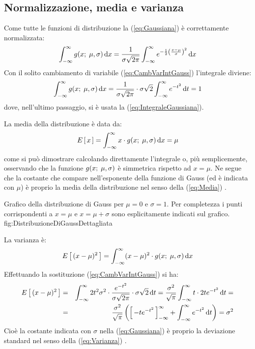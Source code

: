 \subsection{Normalizzazione, media e varianza}

Come tutte le funzioni di distribuzione la (\ref{eq:Gaussiana})
\`e correttamente normalizzata:
$$
\dintegral{\gaussianpdf{x}{\mu, \sigma}}{x}{-\infty}{\infty} =
\frac{1}{\sigma\sqrt{2\pi}}
\dintegral{e^{-\frac{1}{2}\left(\frac{x-\mu}{\sigma}\right)^2}}{x}
{-\infty}{\infty}
$$
Con il solito cambiamento di variabile (\ref{eq:CambVarIntGauss})
l'integrale diviene:
$$
\dintegral{\gaussianpdf{x}{\mu, \sigma}}{x}{-\infty}{\infty} =
\frac{1}{\sigma\sqrt{2\pi}} \cdot \sigma \sqrt{2}
\dintegral{e^{-t^2}}{t}{-\infty}{\infty} = 1
$$
dove, nell'ultimo passaggio, si \`e usata la (\ref{eq:IntegraleGaussiana}).

La media della distribuzione \`e data da:
$$
\expect{x} =
\dintegral{x \cdot \gaussianpdf{x}{\mu, \sigma}}{x}{-\infty}{\infty} = \mu
$$
come si pu\`o dimostrare calcolando direttamente l'integrale
o, pi\`u semplicemente, osservando che la funzione
$\gaussianpdf{x}{\mu, \sigma}$ \`e simmetrica rispetto ad $x=\mu$.
Ne segue che la costante che compare nell'esponente della funzione di Gauss
(ed \`e indicata con $\mu$) \`e proprio la media della distribuzione
nel senso della (\ref{eq:Media}) .

\panelfig
{}
{Grafico della distribuzione di Gauss per $\mu = 0$ e $\sigma = 1$.
Per completezza i punti corrispondenti a $x = \mu$ e $x = \mu + \sigma$
sono esplicitamente indicati sul grafico.}
{fig:DistribuzioneDiGaussDettagliata}

La varianza \`e:
$$
\expect{(x-\mu)^2} =
\dintegral{(x-\mu)^2 \cdot \gaussianpdf{x}{\mu, \sigma}}{x}{-\infty}{\infty}
$$
Effettuando la sostituzione (\ref{eq:CambVarIntGauss}) si ha:
\begin{eqnarray*}
\expect{(x-\mu)^2} & = &
\dintegral{2t^2\sigma^2 \cdot \frac{e^{-t^2}}{\sigma\sqrt{2\pi}} \cdot
\sigma\sqrt{2}}{t}{-\infty}{\infty} =
\frac{\sigma^2}{\sqrt{\pi}}
\dintegral{t\cdot 2te^{-t^2}}{t}{-\infty}{\infty} =\\
& = & \frac{\sigma^2}{\sqrt{\pi}}\left(\eval{-te^{-t^2}}{-\infty}{\infty}+
\dintegral{e^{-t^2}}{t}{-\infty}{\infty}\right)= \sigma^2
\end{eqnarray*}
Cio\`e la costante indicata con $\sigma$ nella (\ref{eq:Gaussiana})
\`e proprio la deviazione standard nel senso della (\ref{eq:Varianza})
.

